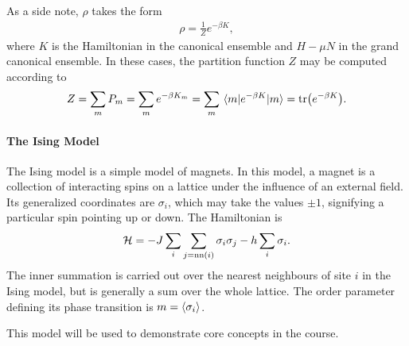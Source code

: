 As a side note, $\rho$ takes the form
\begin{align*}
	\rho = \frac{1}{Z}e^{-\beta K},
\end{align*}
where $K$ is the Hamiltonian in the canonical ensemble and $H - \mu N$ in the grand canonical ensemble. In these cases, the partition function $Z$ may be computed according to
\begin{align*}
	Z = \sum\limits_{m}P_{m} = \sum\limits_{m}e^{-\beta K_{m}} = \sum\limits_{m}\mel{m}{e^{-\beta K}}{m} = \tr(e^{-\beta K}).
\end{align*}

\paragraph{The Ising Model}
The Ising model is a simple model of magnets. In this model, a magnet is a collection of interacting spins on a lattice under the influence of an external field. Its generalized coordinates are $\sigma_{i}$, which may take the values $\pm 1$, signifying a particular spin pointing up or down. The Hamiltonian is
\begin{align*}
	\mathcal{H} = -J\sum\limits_{i}\sum\limits_{j = \text{nn}(i)}\sigma_{i}\sigma_{j} - h\sum\limits_{i}\sigma_{i}.
\end{align*}
The inner summation is carried out over the nearest neighbours of site $i$ in the Ising model, but is generally a sum over the whole lattice. The order parameter defining its phase transition is $m = \expval{\sigma_{i}}$.

This model will be used to demonstrate core concepts in the course.

